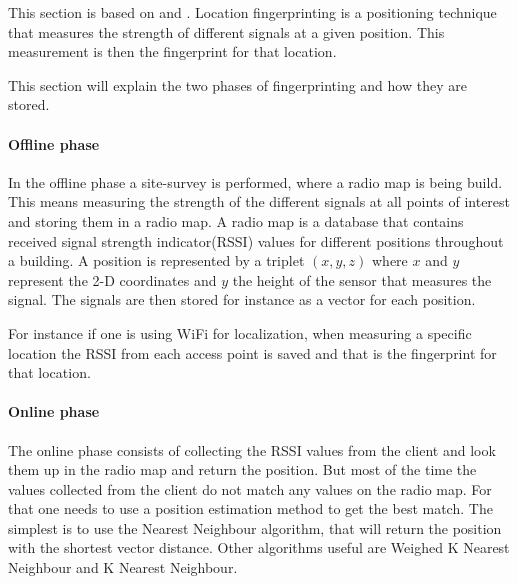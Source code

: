 \label{fingerprinting}
This section is based on \citet{fingerprinting_slides} and \citet{fingerprinting}.
Location fingerprinting is a positioning technique that measures the strength of different signals at a given position.
This measurement is then the fingerprint for that location.

This section will explain the two phases of fingerprinting and how they are stored.
\paragraph{Offline phase}
In the offline phase a site-survey is performed, where a radio map is being build.
This means measuring the strength of the different signals at all points of interest and storing them in a radio map.
A radio map is a database that contains received signal strength indicator(RSSI) values for different positions throughout a building.
A position is represented by a triplet $(x,y,z)$ where $x$ and $y$ represent the 2-D coordinates and $y$ the height of the sensor that measures the signal.
The signals are then stored for instance as a vector for each position.

For instance if one is using WiFi for localization, when measuring a specific location the RSSI from each access point is saved and that is the fingerprint for that location.

\paragraph{Online phase}
The online phase consists of collecting the RSSI values from the client and look them up in the radio map and return the position.
But most of the time the values collected from the client do not match any values on the radio map.
For that one needs to use a position estimation method to get the best match.
The simplest is to use the Nearest Neighbour algorithm, that will return the position with the shortest vector distance.
Other algorithms useful are Weighed K Nearest Neighbour and K Nearest Neighbour.


